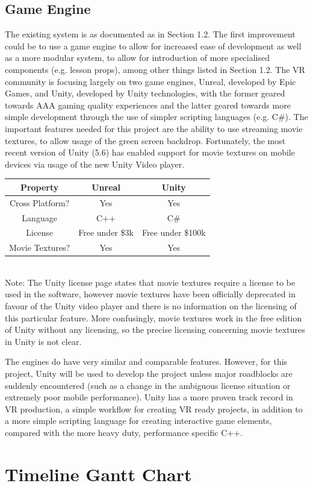 \documentclass[11pt]{report}
\begin{document}
\section{Game Engine}
The existing system is as documented as in Section 1.2. The first improvement could be to use a game engine to allow for increased ease of development as well as a more modular system, to allow for introduction of more specialised components (e.g. lesson props), among other things listed in Section 1.2. The VR community is focusing largely on two game engines, Unreal, developed by Epic Games, and Unity, developed by Unity technologies, with the former geared towards AAA gaming quality experiences and the latter geared towards more simple development through the use of simpler scripting languages (e.g. C\#). The important features needed for this project are the ability to use streaming movie textures, to allow usage of the green screen backdrop. Fortunately, the most recent version of Unity (5.6) has enabled support for movie textures on mobile devices via usage of the new Unity Video player.
\begin{center}
\begin{tabular}{||c c c||} 
\hline
Property & Unreal & Unity \\ [0.5ex] 
\hline\hline
Cross Platform? & Yes & Yes \\ 
\hline
Language& C++ & C\# \\
\hline
License & Free under \$3k & Free under \$100k \* \\
\hline
Movie Textures? &Yes & Yes \\
\hline
\end{tabular}\\
\* Note: The Unity license page states that movie textures require a license to be used in the software, however movie textures have been officially deprecated in favour of the Unity video player and there is no information on the licensing of this particular feature. More confusingly, movie textures work in the free edition of Unity without any licensing, so the precise licensing concerning movie textures in Unity is not clear.
\end{center}
The engines do have very similar and comparable features. However, for this project, Unity will be used to develop the project unless major roadblocks are suddenly encountered (such as a change in the ambiguous license situation or extremely poor mobile performance). Unity has a more proven track record in VR production, a simple workflow for creating VR ready projects, in addition to a more simple scripting language for creating interactive game elements, compared with the more heavy duty, performance specific C++.


\appendix
\chapter{Timeline Gantt Chart}

\end{document}
